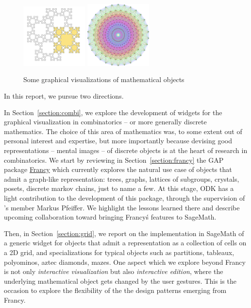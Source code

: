 \documentclass{deliverablereport}
\begin{document}
\begin{figure}
\begin{center}
    \includegraphics[width=0.3\textwidth]{images/619px-Tiling_Fibonacci_word_fractal}
    \hfil
    \includegraphics[width=0.3\textwidth]{images/597px-E8Petrie}
  \end{center}
  \caption{Some graphical visualizations of mathematical objects}
  \label{fig:math_viz}
\end{figure}

In this report, we pursue two directions.

In Section~\ref{section:combi}, we explore the development of widgets
for the graphical visualization in combinatorics -- or more generally
discrete mathematics. The choice of this area of mathematics was, to
some extent out of personal interest and expertise, but more
importantly because devising good representations -- mental images --
of discrete objects is at the heart of research in combinatorics. We
start by reviewing in Section~\ref{section:francy} the GAP package
\href{https://github.com/mcmartins/francy}{Francy} which currently
explores the natural use case of objects that admit a graph-like
representation: trees, graphs, lattices of subgroups, crystals,
posets, discrete markov chains, just to name a few. At this stage, ODK
has a light contribution to the development of this package, through
the supervision of \ODK's member Markus Pfeiffer. We highlight the
lessons learned there and describe upcoming collaboration toward
bringing Francy\'s features to SageMath.

Then, in Section~\ref{section:grid}, we report on the implementation
in SageMath of a generic widget for objects that admit a
representation as a collection of cells on a 2D grid, and
specializations for typical objects such as partitions, tableaux,
polyominos, aztec diamonds, mazes. One aspect which we explore beyond
Francy is not only \emph{interactive visualization} but also
\emph{interactive edition}, where the underlying mathematical object
gets changed by the user gestures. This is the occasion to explore the
flexibility of the the design patterns emerging from Francy.
\end{document}
